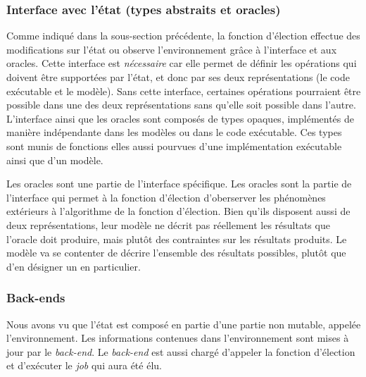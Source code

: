 		\subsubsection{Interface avec l'état (types abstraits et oracles)}
			
			Comme indiqué dans la sous-section précédente, la fonction d'élection effectue des modifications sur l'état ou observe l'environnement grâce à l'interface et aux oracles. Cette interface est \emph{nécessaire} car elle permet de définir les opérations qui doivent être supportées par l'état, et donc par ses deux représentations (le code exécutable et le modèle). Sans cette interface, certaines opérations pourraient être possible dans une des deux représentations sans qu'elle soit possible dans l'autre.
			L'interface ainsi que les oracles sont composés de types opaques, implémentés de manière indépendante dans les modèles ou dans le code exécutable. Ces types sont munis de fonctions elles aussi pourvues d'une implémentation exécutable ainsi que d'un modèle.

			Les oracles sont une partie de l'interface spécifique. Les oracles sont la partie de l'interface qui permet à la fonction d'élection d'oberserver les phénomènes extérieurs à l'algorithme de la fonction d'élection. Bien qu'ils disposent aussi de deux représentations, leur modèle ne décrit pas réellement les résultats que l'oracle doit produire, mais plutôt des contraintes sur les résultats produits. Le modèle va se contenter de décrire l'ensemble des résultats possibles, plutôt que d'en désigner un en particulier.

		\subsubsection{Back-ends}
		\label{sec:back-ends}

		Nous avons vu que l'état est composé en partie d'une partie non mutable, appelée l'environnement. Les informations contenues dans l'environnement sont mises à jour par le \emph{back-end}. Le \emph{back-end} est aussi chargé d'appeler la fonction d'élection et d'exécuter le \emph{job} qui aura été élu.

